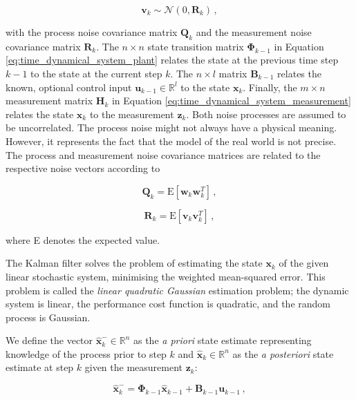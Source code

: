 \begin{equation}\label{eq:measurement_noise}
  \bm{v}_{k} \sim \mathcal{N}(0,\bm{R}_k)\,,
\end{equation}
 
\noindent
with the process noise covariance matrix $\bm{Q}_k$ and the measurement noise covariance matrix $\bm{R}_k$. The $n\times n$ state transition matrix $\bm{\Phi}_{k-1}$ in Equation \ref{eq:time_dynamical_system_plant} relates the state at the previous time step $k-1$ to the state at the current step $k$. The $n\times l$ matrix $\bm{B}_{k-1}$ relates the known, optional control input $\bm{u}_{k-1} \in \mathbb{R}^l$ to the state $\bm{x}_k$. Finally, the $m\times n$ measurement matrix $\bm{H}_{k}$ in Equation \ref{eq:time_dynamical_system_measurement} relates the state $\bm{x}_k$ to the measurement $\bm{z}_k$. Both noise processes are assumed to be uncorrelated. The process noise might not always have a physical meaning. However, it represents the fact that the model of the real world is not precise. The process and measurement noise covariance matrices are related to the respective noise vectors according to

\begin{equation}
  \bm{Q}_k = \mbox{E}[\bm{w}_{k} \bm{w}^T_{k}]\,,
\end{equation}

\begin{equation}
  \bm{R}_k = \mbox{E}[\bm{v}_{k} \bm{v}^T_{k}]\,,
\end{equation}

\noindent
where E denotes the expected value.

The Kalman filter solves the problem of estimating the state $\bm{x}_k$ of the given linear stochastic system, minimising the weighted mean-squared error. This problem is called the \emph{linear quadratic Gaussian} estimation problem; the dynamic system is linear, the performance cost function is quadratic, and the random process is Gaussian.

We define the vector $\hat{\bm{x}}^-_k \in \mathbb{R}^n$ as the \emph{a priori} state estimate representing knowledge of the process prior to step $k$ and $\hat{\bm{x}}_k \in \mathbb{R}^n$ as the \emph{a posteriori} state estimate at step $k$ given the measurement $\bm{z}_k$:

\begin{equation}\label{eq:apriori_estimate}
  \hat{\bm{x}}^-_k = \bm{\Phi}_{k-1}\hat{\bm{x}}_{k-1}+\bm{B}_{k-1}\bm{u}_{k-1}\,,
\end{equation}

